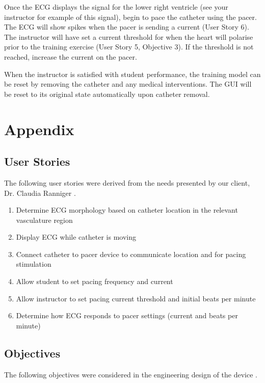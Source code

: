 \documentclass[12pt, titlepage]{article}
\begin{document}
Once the ECG displays the signal for the lower right ventricle (see your instructor for example of this signal), begin to pace the catheter using the pacer. The ECG will show spikes when the pacer is sending a current (User Story 6). The instructor will have set a current threshold for when the heart will polarise prior to the training exercise (User Story 5, Objective 3). If the threshold is not reached, increase the current on the pacer.

When the instructor is satisfied with student performance, the training model can be reset by removing the catheter and any medical interventions. The GUI will be reset to its original state automatically upon catheter removal.



\clearpage
\section{Appendix}

\subsection{User Stories}
The following user stories were derived from the needs presented by our client, Dr. Claudia Ranniger \cite{sprintlog}.

\begin{enumerate}
  \item Determine ECG morphology based on catheter location in the relevant vasculature region
  \item Display ECG while catheter is moving
  \item Connect catheter to pacer device to communicate location and for pacing stimulation
  \item Allow student to set pacing frequency and current
  \item Allow instructor to set pacing current threshold and initial beats per minute
  \item Determine how ECG responds to pacer settings (current and beats per minute)
\end{enumerate}


\subsection{Objectives}
The following objectives were considered in the engineering design of the device \cite{backgroundreport}.
\end{document}
